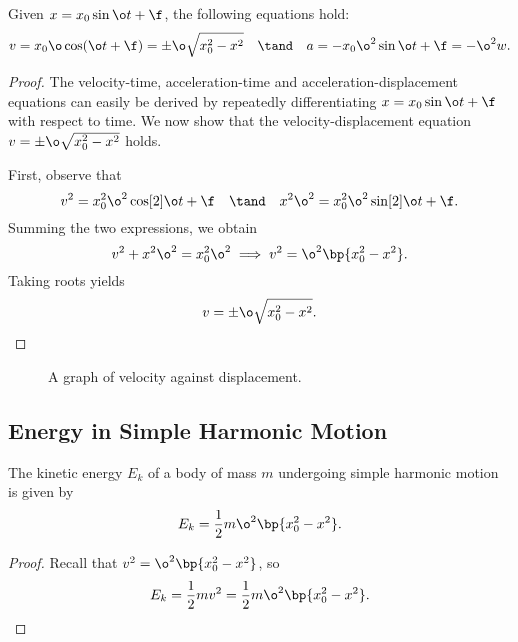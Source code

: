 \begin{proposition}
    Given $x = x_0 \sin{\o t + \f}$, the following equations hold: \[v = x_0 \o \cos(\o t + \f) = \pm \o \sqrt{x_0^2 - x^2} \quad \tand \quad a = -x_0 \o^2 \sin{\o t + \f} = -\o^2 w.\]
\end{proposition}
\begin{proof}
    The velocity-time, acceleration-time and acceleration-displacement equations can easily be derived by repeatedly differentiating $x = x_0 \sin{\o t + \f}$ with respect to time. We now show that the velocity-displacement equation $v = \pm \o \sqrt{x_0^2 - x^2}$ holds.

    First, observe that \[v^2 = x_0^2 \o^2 \cos[2]{\o t + \f} \quad \tand \quad x^2 \o^2 = x_0^2 \o^2 \sin[2]{\o t + \f}.\] Summing the two expressions, we obtain \[v^2 + x^2 \o^2 = x_0^2 \o^2 \implies v^2 = \o^2 \bp{x_0^2 - x^2}.\] Taking roots yields \[v = \pm \o \sqrt{x_0^2 - x^2}.\]
\end{proof}

\begin{figure}[H]
    \centering
    \caption{A graph of velocity against displacement.}
\end{figure}

\subsection{Energy in Simple Harmonic Motion}

\begin{proposition}
    The kinetic energy $E_k$ of a body of mass $m$ undergoing simple harmonic motion is given by \[E_k = \frac12 m \o^2 \bp{x_0^2 - x^2}.\]
\end{proposition}
\begin{proof}
    Recall that $v^2 = \o^2 \bp{x_0^2 - x^2}$, so \[E_k = \frac12 mv^2 = \frac12 m \o^2 \bp{x_0^2 - x^2}.\]
\end{proof}

